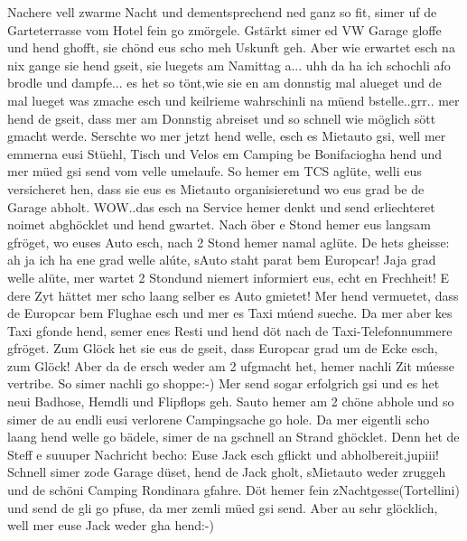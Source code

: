 Nachere vell zwarme Nacht und dementsprechend ned ganz so fit, simer uf de Garteterrasse vom Hotel fein go zmörgele.
Gstärkt simer ed VW Garage gloffe und hend ghofft, sie chönd eus scho meh Uskunft geh.
Aber wie erwartet esch na nix gange sie hend gseit, sie luegets am Namittag a...
uhh da ha ich schochli afo brodle und dampfe...
es het so tönt,wie sie en am donnstig mal alueget und de mal lueget was zmache esch und keilrieme wahrschinli na müend bstelle..grr..
mer hend de gseit, dass mer am Donnstig abreiset und so schnell wie möglich sött gmacht werde.
Serschte wo mer jetzt hend welle, esch es Mietauto gsi, well mer emmerna eusi Stüehl, Tisch und Velos em Camping be Bonifaciogha hend und mer müed gsi send vom velle umelaufe.
So hemer em TCS aglüte, welli eus versicheret hen, dass sie eus es Mietauto organisieretund wo eus grad be de Garage abholt.
WOW..das esch na Service hemer denkt und send erliechteret noimet abghöcklet und hend gwartet.
Nach öber e Stond hemer eus langsam gfröget, wo euses Auto esch, nach 2 Stond hemer namal aglüte.
De hets gheisse: ah ja ich ha ene grad welle alúte, sAuto staht parat bem Europcar! Jaja grad welle alüte, mer wartet 2 Stondund niemert informiert eus, echt en Frechheit! E dere Zyt hättet mer scho laang selber es Auto gmietet! Mer hend vermuetet, dass de Europcar bem Flughae esch und mer es Taxi múend sueche. Da mer aber kes Taxi gfonde hend, semer enes Resti und hend döt nach de Taxi-Telefonnummere gfröget.
Zum Glöck het sie eus de gseit, dass Europcar grad um de Ecke esch, zum Glöck! Aber da de ersch weder am 2 ufgmacht het, hemer nachli Zit múesse vertribe.
So simer nachli go shoppe:-) Mer send sogar erfolgrich gsi und es het neui Badhose, Hemdli und Flipflops geh.
Sauto hemer am 2 chöne abhole und so simer de au endli eusi verlorene Campingsache go hole.
Da mer eigentli scho laang hend welle go bädele, simer de na gschnell an Strand ghöcklet.
Denn het de Steff e suuuper Nachricht becho: Euse Jack esch gflickt und abholbereit,jupiii! Schnell simer zode Garage düset, hend de Jack gholt, sMietauto weder zruggeh und de schöni Camping Rondinara gfahre.
Döt hemer fein zNachtgesse(Tortellini) und send de gli go pfuse, da mer zemli müed gsi send.
Aber au sehr glöcklich, well mer euse Jack weder gha hend:-)

